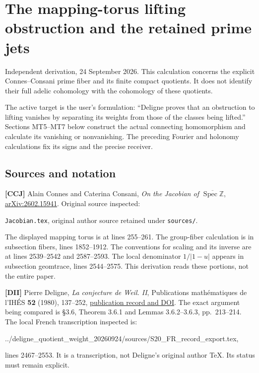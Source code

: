 \section{The mapping-torus lifting obstruction and the retained prime
jets}\label{the-mapping-torus-lifting-obstruction-and-the-retained-prime-jets}

Independent derivation, 24 September 2026. This calculation concerns the
explicit Connes--Consani prime fiber and its finite compact quotients.
It does not identify their full adelic cohomology with the cohomology of
these quotients.

The active target is the user's formulation: ``Deligne proves that an
obstruction to lifting vanishes by separating its weights from those of
the classes being lifted.'' Sections MT5--MT7 below construct the actual
connecting homomorphism and calculate its vanishing or nonvanishing. The
preceding Fourier and holonomy calculations fix its signs and the
precise receiver.

\subsection{Sources and notation}\label{sources-and-notation}

\textbf{{[}CCJ{]}} Alain Connes and Caterina Consani, \emph{On the
Jacobian of \(\overline{\operatorname{Spec}\mathbb Z}\)},
\href{https://arxiv.org/abs/2602.15941}{arXiv:2602.15941}. Original
source inspected:

\nolinkurl{Jacobian.tex}, original author source retained under
\texttt{sources/}.

The displayed mapping torus is at lines 255--261. The group-fiber
calculation is in subsection fibers, lines 1852--1912. The conventions
for scaling and its inverse are at lines 2539--2542 and 2587--2593. The
local denominator \(1/|1-u|\) appears in subsection geomtrace, lines
2544--2575. This derivation reads these portions, not the entire paper.

\textbf{{[}DII{]}} Pierre Deligne, \emph{La conjecture de Weil. II},
Publications mathématiques de l'IHÉS \textbf{52} (1980), 137--252,
\href{https://www.numdam.org/item/PMIHES_1980__52__137_0/}{publication
record and DOI}. The exact argument being compared is §3.6, Theorem
3.6.1 and Lemmas 3.6.2--3.6.3, pp.~213--214. The local French
transcription inspected is:

../deligne\_quotient\_weight\_20260924/sources/S20\_FR\_record\_export.tex,

lines 2467--2553. It is a transcription, not Deligne's original author
TeX. Its status must remain explicit.

